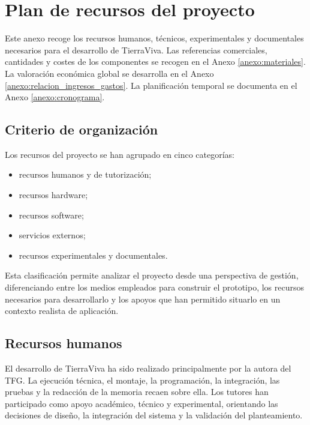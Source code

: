 \chapter{Plan de recursos del proyecto}
\label{anexo:plan_recursos}

Este anexo recoge los recursos humanos, técnicos, experimentales y documentales necesarios para el desarrollo de TierraViva. Las referencias comerciales, cantidades y costes de los componentes se recogen en el Anexo \ref{anexo:materiales}. La valoración económica global se desarrolla en el Anexo \ref{anexo:relacion_ingresos_gastos}. La planificación temporal se documenta en el Anexo \ref{anexo:cronograma}.

\section{Criterio de organización}

Los recursos del proyecto se han agrupado en cinco categorías:

\begin{itemize}
    \item recursos humanos y de tutorización;
    \item recursos hardware;
    \item recursos software;
    \item servicios externos;
    \item recursos experimentales y documentales.
\end{itemize}

Esta clasificación permite analizar el proyecto desde una perspectiva de gestión, diferenciando entre los medios empleados para construir el prototipo, los recursos necesarios para desarrollarlo y los apoyos que han permitido situarlo en un contexto realista de aplicación.

\section{Recursos humanos}

El desarrollo de TierraViva ha sido realizado principalmente por la autora del TFG. La ejecución técnica, el montaje, la programación, la integración, las pruebas y la redacción de la memoria recaen sobre ella. Los tutores han participado como apoyo académico, técnico y experimental, orientando las decisiones de diseño, la integración del sistema y la validación del planteamiento.

